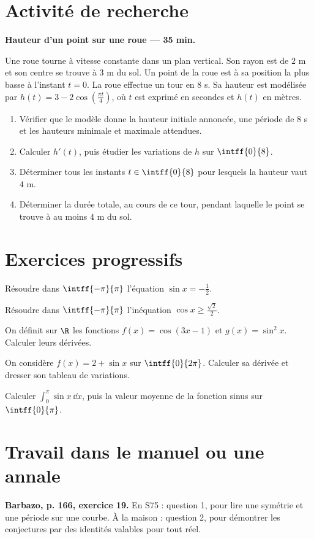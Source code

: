 \mxnewpage
\section{Activité de recherche}\textbf{Hauteur d'un point sur une roue --- 35 min.}\par Une roue tourne à vitesse constante dans un plan vertical. Son rayon est de $2$ m et son centre se trouve à $3$ m du sol. Un point de la roue est à sa position la plus basse à l'instant $t=0$. La roue effectue un tour en $8$ s. Sa hauteur est modélisée par $h(t)=3-2\cos\left(\frac{\pi t}{4}\right)$, où $t$ est exprimé en secondes et $h(t)$ en mètres.
\begin{enumerate}\item Vérifier que le modèle donne la hauteur initiale annoncée, une période de $8$ s et les hauteurs minimale et maximale attendues.
\item Calculer $h' (t)$, puis étudier les variations de $h$ sur $\intff{0}{8}$.
\item Déterminer tous les instants $t\in\intff{0}{8}$ pour lesquels la hauteur vaut $4$ m.
\item Déterminer la durée totale, au cours de ce tour, pendant laquelle le point se trouve à au moins $4$ m du sol.\end{enumerate}

\mxnewpage
\section{Exercices progressifs}

Résoudre dans $\intff{-\pi}{\pi}$ l'équation $\sin x=-\frac12$.

Résoudre dans $\intff{-\pi}{\pi}$ l'inéquation $\cos x\ge\frac{\sqrt2}{2}$.

On définit sur $\R$ les fonctions $f(x)=\cos(3x-1)$ et $g(x)=\sin^2x$. Calculer leurs dérivées.

On considère $f(x)=2+\sin x$ sur $\intff{0}{2\pi}$. Calculer sa dérivée et dresser son tableau de variations.

Calculer $\displaystyle\int_0^\pi\sin x\,\dd x$, puis la valeur moyenne de la fonction sinus sur $\intff{0}{\pi}$.

\section{Travail dans le manuel ou une annale}\textbf{Barbazo, p. 166, exercice 19.} En S75 : question 1, pour lire une symétrie et une période sur une courbe. À la maison : question 2, pour démontrer les conjectures par des identités valables pour tout réel.


